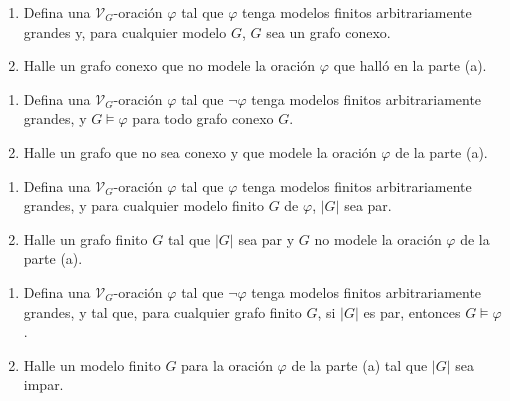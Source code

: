 \documentclass[12pt,a4paper]{book}
\newcommand{\VV}{\mathcal{V}}
\begin{document}
    \begin{ejercicio}
        \begin{enumerate}[label=(\alph*)]
            \item Defina una $\VV_{G}$-oración $\varphi$ tal que $\varphi$ tenga modelos finitos arbitrariamente grandes
            y, para cualquier modelo $G$, $G$ sea un grafo conexo.
            \item Halle un grafo conexo que no modele la oración $\varphi$ que halló en la parte (a).
        \end{enumerate}
    \end{ejercicio}

    \begin{ejercicio}
        \begin{enumerate}[label=(\alph*)]
            \item Defina una $\VV_{G}$-oración $\varphi$ tal que $\neg\varphi$ tenga modelos finitos arbitrariamente
            grandes, y $G\models\varphi$ para todo grafo conexo $G$.
            \item Halle un grafo que no sea conexo y que modele la oración $\varphi$ de la parte (a).
        \end{enumerate}
    \end{ejercicio}

    \begin{ejercicio}
        \begin{enumerate}[label=(\alph*)]
            \item Defina una $\VV_{G}$-oración $\varphi$ tal que $\varphi$ tenga modelos finitos arbitrariamente
            grandes, y para cualquier modelo finito $G$ de $\varphi$, $|G|$ sea par.
            \item Halle un grafo finito $G$ tal que $|G|$ sea par y $G$ no modele la oración $\varphi$ de la parte (a).
        \end{enumerate}
    \end{ejercicio}

    \begin{ejercicio}
        \begin{enumerate}[label=(\alph*)]
            \item Defina una $\VV_{G}$-oración $\varphi$ tal que $\neg\varphi$ tenga modelos finitos arbitrariamente
            grandes, y tal que, para cualquier grafo finito $G$, si $|G|$ es par, entonces $G\models\varphi$.
            \item Halle un modelo finito $G$ para la oración $\varphi$ de la parte (a) tal que $|G|$ sea impar.
        \end{enumerate}
    \end{ejercicio}
\end{document}
